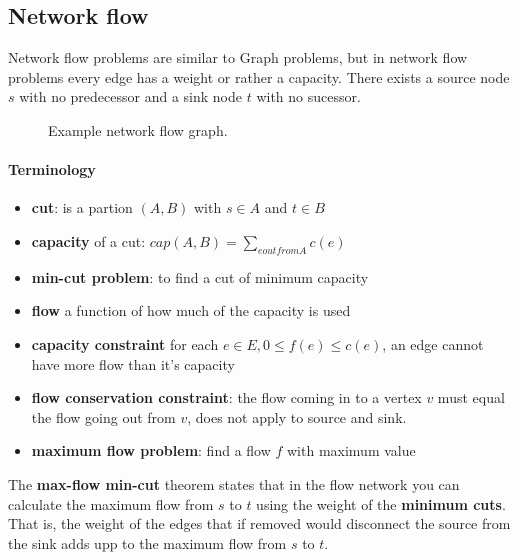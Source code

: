 \documentclass[12pt]{article} %
\begin{document}
\subsection{Network flow} %
Network flow problems are similar to Graph problems, but in network flow problems every edge has a weight or rather a capacity. There exists a source node $s$ with no predecessor and a sink node $t$ with no sucessor.

\begin{figure}[H]
\caption{Example network flow graph.}
\label{flow}
\end{figure} 

\paragraph{Terminology}
\begin{itemize}
    \item \textbf{cut}: is a partion $(A, B)$ with $s \in A$ and $t \in B$
    \item \textbf{capacity} of a cut: $cap(A, B) = \sum_{e out from A} c(e)$
    \item \textbf{min-cut problem}: to find a cut of minimum capacity
    \item \textbf{flow} a function of how much of the capacity is used
    \item \textbf{capacity constraint} for each $e \in E, 0 \leq f(e) \leq c(e)$, an edge cannot have more flow than it's capacity
    \item \textbf{flow conservation constraint}: the flow coming in to a vertex $v$ must equal the flow going out from $v$, does not apply to source and sink.
    \item \textbf{maximum flow problem}: find a flow $f$ with maximum value
\end{itemize}

\par The \textbf{max-flow min-cut} theorem states that in the flow network you can calculate the maximum flow from $s$ to $t$ using the weight of the \textbf{minimum cuts}. That is, the weight of the edges that if removed would disconnect the source from the sink adds upp to the maximum flow from $s$ to $t$.
\end{document}

